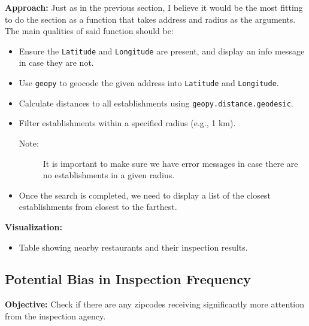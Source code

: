 \documentclass[12pt]{article}
\begin{document}
\textbf{Approach:}
Just as in the previous section, I believe it would be the most fitting to do the section as a function that takes address and radius as the arguments.
The main qualities of said function should be:
\begin{itemize}
    \item Ensure the \texttt{Latitude} and \texttt{Longitude} are present, and display an info message in case they are not.
    \item Use \texttt{geopy} to geocode the given address into \texttt{Latitude} and \texttt{Longitude}.
    \item Calculate distances to all establishments using \texttt{geopy.distance.geodesic}.
    \item Filter establishments within a specified radius (e.g., 1 km).
    \begin{description}
        \item[Note:] It is important to make sure we have error messages in case there are no establishments in a given radius.
    \end{description}
    \item Once the search is completed, we need to display a list of the closest establishments from closest to the farthest.
\end{itemize}

\textbf{Visualization:}
\begin{itemize}
    \item Table showing nearby restaurants and their inspection results.
\end{itemize}

\subsection*{Potential Bias in Inspection Frequency}
\textbf{Objective:} Check if there are any zipcodes receiving significantly more attention from the inspection agency.
\end{document}

